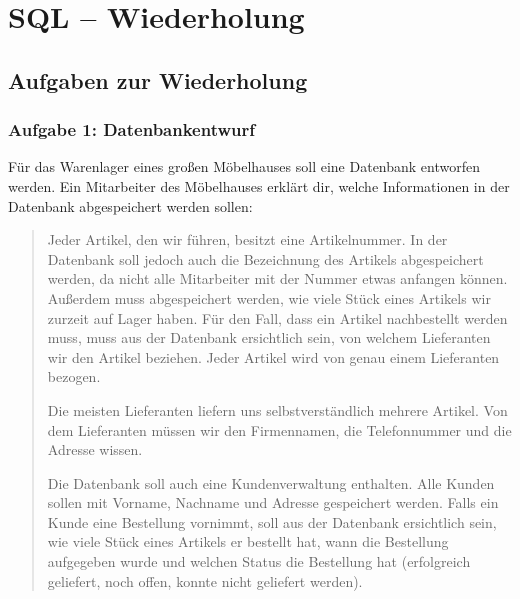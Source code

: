 \chapter{SQL -- Wiederholung}
\renewcommand{\chaptertitle}{SQL -- Wiederholung}

\lehead[]{\normalfont\sffamily\hspace*{-2.00cm}\textcolor{white}{\colorbox{lightblue}{\makebox[1.60cm][r]{\thechapter}}}\hspace{0.17cm}\textcolor{lightblue}{\chaptertitle}}
\rohead[]{\textcolor{lightblue}{\chaptertitle}\normalfont\sffamily\hspace*{0.17cm}\textcolor{white}{\colorbox{lightblue}{\makebox[1.60cm][l]{\thechapter}}}\hspace{-2.00cm}}
\rehead[]{\textcolor{lightblue}{AvHG, Inf, My}}
\lohead[]{\textcolor{lightblue}{AvHG, Inf, My}}

\section{Aufgaben zur Wiederholung}

\subsection{Aufgabe 1: Datenbankentwurf}

Für das Warenlager eines großen Möbelhauses soll eine Datenbank entworfen
werden. Ein Mitarbeiter des Möbelhauses erklärt dir, welche Informationen in der
Datenbank abgespeichert werden sollen:

\begin{quotation}
\noindent Jeder Artikel, den wir führen, besitzt eine Artikelnummer. In der
Datenbank soll jedoch auch die Bezeichnung des Artikels abgespeichert werden,
da nicht alle Mitarbeiter mit der Nummer etwas anfangen können. Außerdem muss
abgespeichert werden, wie viele Stück eines Artikels wir zurzeit auf Lager
haben. Für den Fall, dass ein Artikel nachbestellt werden muss, muss aus der
Datenbank ersichtlich sein, von welchem Lieferanten wir den Artikel beziehen.
Jeder Artikel wird von genau einem Lieferanten bezogen.

\noindent Die meisten Lieferanten liefern uns selbstverständlich mehrere
Artikel. Von dem Lieferanten müssen wir den Firmennamen, die Telefonnummer und
die Adresse wissen.

\noindent Die Datenbank soll auch eine Kundenverwaltung enthalten. Alle Kunden
sollen mit Vorname, Nachname und Adresse gespeichert werden. Falls ein Kunde eine
Bestellung vornimmt, soll aus der Datenbank ersichtlich sein, wie viele Stück
eines Artikels er bestellt hat, wann die Bestellung aufgegeben wurde und welchen
Status die Bestellung hat (erfolgreich geliefert, noch offen, konnte nicht
geliefert werden).
\end{quotation}

